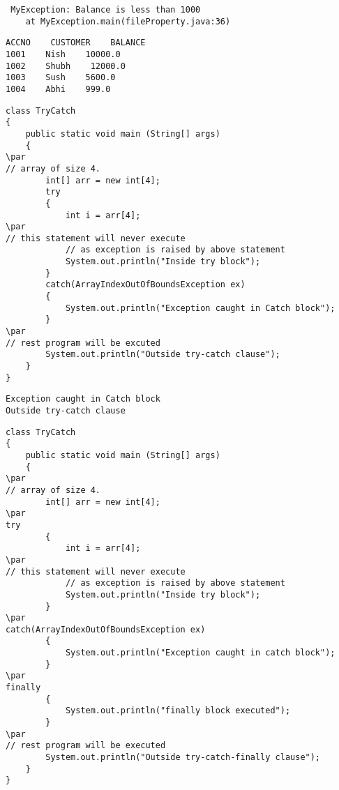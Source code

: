 \documentclass{book}
\def\lthtmlcheckvsize{\ifdim\ht\sizebox<\vsize 
  \ifdim\wd\sizebox<\hsize\expandafter\hfill\fi \expandafter\vfill
  \else\expandafter\vss\fi}%
\begin{document}
{\newpage\clearpage
{}%
\begin{lstlisting}
 MyException: Balance is less than 1000
    at MyException.main(fileProperty.java:36)
\end{lstlisting}%
\lthtmlfigureZ
\lthtmlcheckvsize\clearpage}

{\newpage\clearpage
{}%
\begin{lstlisting}
ACCNO    CUSTOMER    BALANCE
1001    Nish    10000.0
1002    Shubh    12000.0
1003    Sush    5600.0
1004    Abhi    999.0
\end{lstlisting}%
\lthtmlfigureZ
\lthtmlcheckvsize\clearpage}

{\newpage\clearpage
{}%
\begin{lstlisting}
class TryCatch
{ 
    public static void main (String[] args)  
    { 
\par
// array of size 4. 
        int[] arr = new int[4]; 
        try
        { 
            int i = arr[4]; 
\par
// this statement will never execute 
            // as exception is raised by above statement 
            System.out.println("Inside try block"); 
        } 
        catch(ArrayIndexOutOfBoundsException ex) 
        { 
            System.out.println("Exception caught in Catch block"); 
        } 
\par
// rest program will be excuted 
        System.out.println("Outside try-catch clause"); 
    } 
} 
\end{lstlisting}%
\lthtmlfigureZ
\lthtmlcheckvsize\clearpage}

{\newpage\clearpage
{}%
\begin{lstlisting}
Exception caught in Catch block
Outside try-catch clause
\end{lstlisting}%
\lthtmlfigureZ
\lthtmlcheckvsize\clearpage}

{\newpage\clearpage
{}%
\begin{lstlisting}
class TryCatch 
{ 
    public static void main (String[] args)  
    { 
\par
// array of size 4. 
        int[] arr = new int[4]; 
\par
try
        { 
            int i = arr[4]; 
\par
// this statement will never execute 
            // as exception is raised by above statement 
            System.out.println("Inside try block"); 
        } 
\par
catch(ArrayIndexOutOfBoundsException ex) 
        { 
            System.out.println("Exception caught in catch block"); 
        } 
\par
finally
        { 
            System.out.println("finally block executed"); 
        } 
\par
// rest program will be executed 
        System.out.println("Outside try-catch-finally clause"); 
    } 
} 
\end{lstlisting}%
\lthtmlfigureZ
\lthtmlcheckvsize\clearpage}
\end{document}

